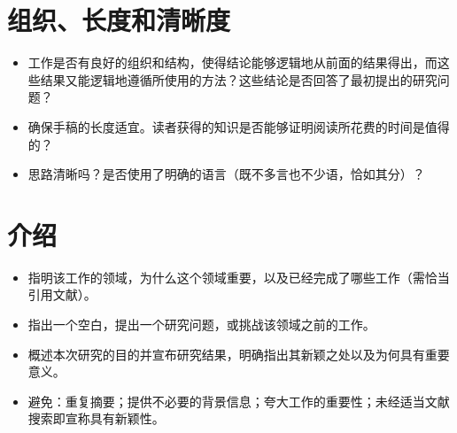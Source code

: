 \section*{组织、长度和清晰度}
\begin{itemize}
\item 工作是否有良好的组织和结构，使得结论能够逻辑地从前面的结果得出，而这些结果又能逻辑地遵循所使用的方法？这些结论是否回答了最初提出的研究问题？
\item 确保手稿的长度适宜。读者获得的知识是否能够证明阅读所花费的时间是值得的？
\item 思路清晰吗？是否使用了明确的语言（既不多言也不少语，恰如其分）？
\end{itemize}

\section*{介绍}
\begin{itemize}
\item 指明该工作的领域，为什么这个领域重要，以及已经完成了哪些工作（需恰当引用文献）。
\item 指出一个空白，提出一个研究问题，或挑战该领域之前的工作。
\item 概述本次研究的目的并宣布研究结果，明确指出其新颖之处以及为何具有重要意义。
\item 避免：重复摘要；提供不必要的背景信息；夸大工作的重要性；未经适当文献搜索即宣称具有新颖性。
\end{itemize}

